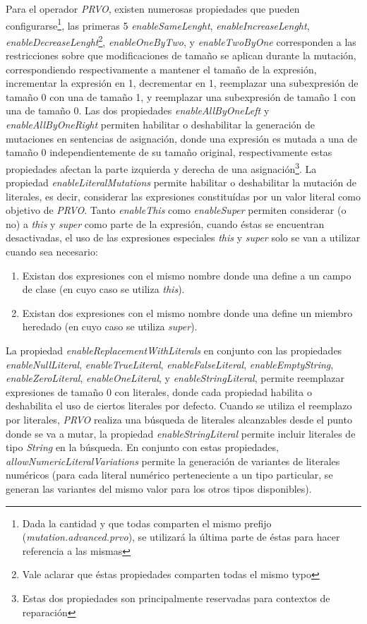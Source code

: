 Para el operador \emph{PRVO}, existen numerosas propiedades que pueden configurarse\footnote{Dada la cantidad y que todas comparten el mismo prefijo (\emph{mutation.advanced.prvo}), se utilizar\'a la \'ultima parte de \'estas para hacer referencia a las mismas}, las primeras 5 \emph{enableSameLenght}, \emph{enableIncreaseLenght}, \emph{enableDecreaseLenght}\footnote{Vale aclarar que \'estas propiedades comparten todas el mismo typo}, \emph{enableOneByTwo}, y \emph{enableTwoByOne} corresponden a las restricciones sobre que modificaciones de tama\~no se aplican durante la mutaci\'on, correspondiendo respectivamente a mantener el tama\~no de la expresi\'on, incrementar la expresi\'on en 1, decrementar en 1, reemplazar una subexpresi\'on de tama\~no 0 con una de tama\~no 1, y reemplazar una subexpresi\'on de tama\~no 1 con una de tama\~no 0. Las dos propiedades \emph{enableAllByOneLeft} y \emph{enableAllByOneRight} permiten habilitar o deshabilitar la generaci\'on de mutaciones en sentencias de asignaci\'on, donde una expresi\'on es mutada a una de tama\~no 0 independientemente de su tama\~no original, respectivamente estas propiedades afectan la parte izquierda y derecha de una asignaci\'on\footnote{Estas dos propiedades son principalmente reservadas para contextos de reparaci\'on}. La propiedad \emph{enableLiteralMutations} permite habilitar o deshabilitar la mutaci\'on de literales, es decir, considerar las expresiones constitu\'idas por un valor literal como objetivo de \emph{PRVO}. Tanto \emph{enableThis} como \emph{enableSuper} permiten considerar (o no) a \emph{this} y \emph{super} como parte de la expresi\'on, cuando \'estas se encuentran desactivadas, el uso de las expresiones especiales \emph{this} y \emph{super} solo se van a utilizar cuando sea necesario:
\begin{enumerate}[leftmargin=.75cm,align=left,style=nextline]
	\item Existan dos expresiones con el mismo nombre donde una define a un campo de clase (en cuyo caso se utiliza \emph{this}).
	
	\item Existan dos expresiones con el mismo nombre donde una define un miembro heredado (en cuyo caso se utiliza \emph{super}).
\end{enumerate}
La propiedad \emph{enableReplacementWithLiterals} en conjunto con las propiedades \emph{enableNullLiteral}, \emph{enableTrueLiteral}, \emph{enableFalseLiteral}, \emph{enableEmptyString}, \emph{enableZeroLiteral}, \emph{enableOneLiteral}, y \emph{enableStringLiteral}, permite reemplazar expresiones de tama\~no 0 con literales, donde cada propiedad habilita o deshabilita el uso de ciertos literales por defecto. Cuando se utiliza el reemplazo por literales, \emph{PRVO} realiza una b\'usqueda de literales alcanzables desde el punto donde se va a mutar, la propiedad \emph{enableStringLiteral} permite incluir literales de tipo \emph{String} en la b\'usqueda. En conjunto con estas propiedades, \emph{allowNumericLiteralVariations} permite la generaci\'on de variantes de literales num\'ericos (para cada literal num\'erico perteneciente a un tipo particular, se generan las variantes del mismo valor para los otros tipos disponibles).

